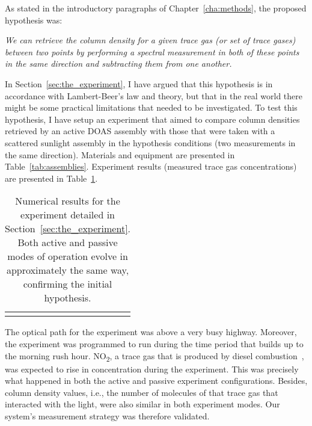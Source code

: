 As stated in the introductory paragraphs of Chapter~\ref{cha:methods},
the proposed hypothesis was:

\begin{center}
\end{center}
\begin{center}
    \begin{minipage}{0.8\textwidth}

        \noindent\textit{We can retrieve the column density for a given
        trace gas (or set of trace gases) between two points by
        performing a spectral measurement in both of these points in the
        same direction and subtracting them from one another.}

    \end{minipage}
\end{center}
In Section~\ref{sec:the_experiment}, I have argued that this hypothesis
is in accordance with Lambert-Beer's law and theory, but that in the
real world there might be some practical limitations that needed to be
investigated. To test this hypothesis, I have setup an experiment that
aimed to compare column densities retrieved by an active \gls{DOAS}
assembly with those that were taken with a scattered sunlight assembly
in the hypothesis conditions (two measurements in the same direction).
Materials and equipment are presented in Table~\ref{tab:assemblies}.
Experiment results (measured trace gas concentrations) are presented in
Table~\ref{tab:experiment_results}. 

\begin{table}[htpb]
    \centering
    \caption{Numerical results for the experiment detailed in
    Section~\ref{sec:the_experiment}. Both active and passive modes of
    operation evolve in approximately the same way, confirming the initial
    hypothesis.}
    \label{tab:experiment_results}
    \begin{tabular}{c}
    \missingfigure{}
    \end{tabular}
\end{table}

The optical path for the experiment was above a very busy highway.
Moreover, the experiment was programmed to run during the time period
that builds up to the morning rush hour. NO\textsubscript{2}, a
trace gas that is produced by diesel combustion~, was expected to rise in concentration during the experiment.
This was precisely what happened in both the active and passive
experiment configurations. Besides, column density values, i.e., the
number of molecules of that trace gas that interacted with the light,
were also similar in both experiment modes. Our system's measurement
strategy was therefore validated.

